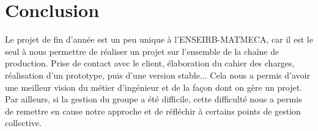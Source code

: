 \chapter*{Conclusion}

Le projet de fin d'année est un peu unique à l'ENSEIRB-MATMECA, car il est le seul à nous permettre de réaliser un projet sur l'ensemble de la chaîne de production. Prise de contact avec le client, élaboration du cahier des charges, réalisation d'un prototype, puis d'une version stable... Cela nous a permis d'avoir une meilleur vision du métier d'ingénieur et de la façon dont on gère un projet. Par ailleurs, si la gestion du groupe a été difficile, cette difficulté nous a permis de remettre en cause notre approche et de réfléchir à certains points de gestion collective.
